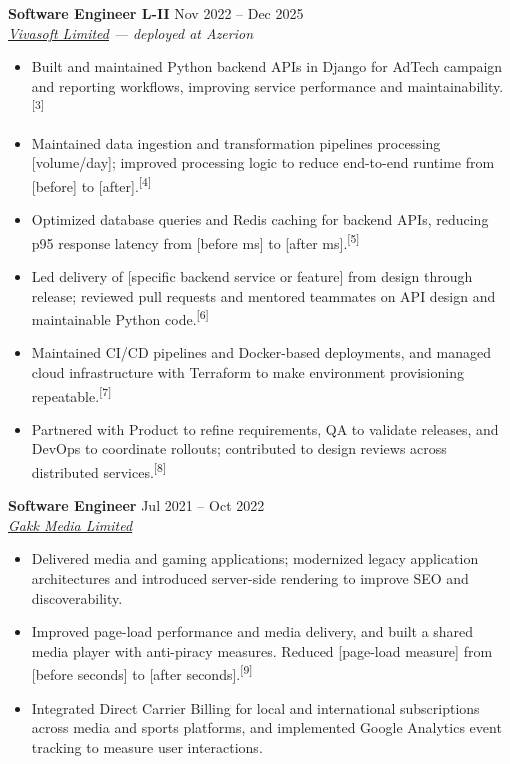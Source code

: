 \documentclass[10pt,a4paper]{article}
\newcommand{\proposed}[2]{#2\textsuperscript{\textcolor{review}{[#1]}}}
\newcommand{\metric}[1]{{\color{review}[#1]}}
\begin{document}
\textbf{Software Engineer L-II} \hfill Nov 2022 -- Dec 2025\\
\href{https://vivasoftltd.com/}{\textit{Vivasoft Limited}} \textit{--- deployed at Azerion}
\begin{itemize}
    \item \proposed{3}{Built and maintained Python backend APIs in Django for AdTech campaign and reporting workflows, improving service performance and maintainability.}
    \item \proposed{4}{Maintained data ingestion and transformation pipelines processing \metric{volume/day}; improved processing logic to reduce end-to-end runtime from \metric{before} to \metric{after}.}
    \item \proposed{5}{Optimized database queries and Redis caching for backend APIs, reducing p95 response latency from \metric{before ms} to \metric{after ms}.}
    \item \proposed{6}{Led delivery of \metric{specific backend service or feature} from design through release; reviewed pull requests and mentored teammates on API design and maintainable Python code.}
    \item \proposed{7}{Maintained CI/CD pipelines and Docker-based deployments, and managed cloud infrastructure with Terraform to make environment provisioning repeatable.}
    \item \proposed{8}{Partnered with Product to refine requirements, QA to validate releases, and DevOps to coordinate rollouts; contributed to design reviews across distributed services.}
\end{itemize}

\textbf{Software Engineer} \hfill Jul 2021 -- Oct 2022\\
\href{https://gakktechnology.com/}{\textit{Gakk Media Limited}}
\begin{itemize}
    \item Delivered media and gaming applications; modernized legacy application architectures and introduced server-side rendering to improve SEO and discoverability.
    \item Improved page-load performance and media delivery, and built a shared media player with anti-piracy measures. \proposed{9}{Reduced \metric{page-load measure} from \metric{before seconds} to \metric{after seconds}.}
    \item Integrated Direct Carrier Billing for local and international subscriptions across media and sports platforms, and implemented Google Analytics event tracking to measure user interactions.
\end{itemize}
\end{document}
